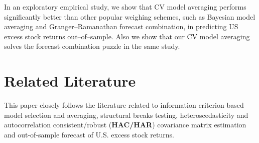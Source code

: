\documentclass[a4paper,12pt]{article}
\begin{document}
In an exploratory empirical study, we show that CV model averaging performs significantly better than other popular weighing schemes, such as Bayesian model averaging and Granger--Ramanathan forecast combination, in predicting US excess stock returns out--of--sample. Also we show that our CV model averaging solves the forecast combination puzzle in the same study.

\section{Related Literature}

This paper closely follows the literature related to information criterion based model selection and averaging, structural breaks testing, heteroscedasticity and autocorrelation consistent/robust (\textbf{HAC/HAR}) covariance matrix estimation and out-of-sample forecast of U.S. excess stock returns.
\end{document}
